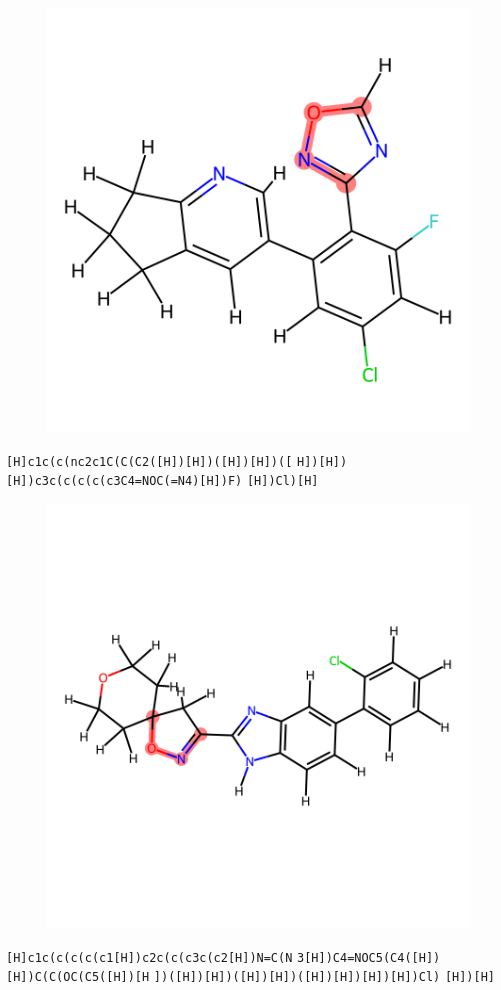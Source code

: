 \documentclass{article}
\begin{document}
\begin{figure}[ht]
\centering
    \includegraphics{mol238.png}
\end{figure}
\verb|[H]c1c(c(nc2c1C(C(C2([H])[H])([H])[H])([| \verb|H])[H])[H])c3c(c(c(c(c3C4=NOC(=N4)[H])F)| \verb|[H])Cl)[H]|

\begin{figure}[ht]
\centering
    \includegraphics{mol239.png}
\end{figure}
\verb|[H]c1c(c(c(c(c1[H])c2c(c(c3c(c2[H])N=C(N| \verb|3[H])C4=NOC5(C4([H])[H])C(C(OC(C5([H])[H| \verb|])([H])[H])([H])[H])([H])[H])[H])[H])Cl)| \verb|[H])[H]|
\end{document}
